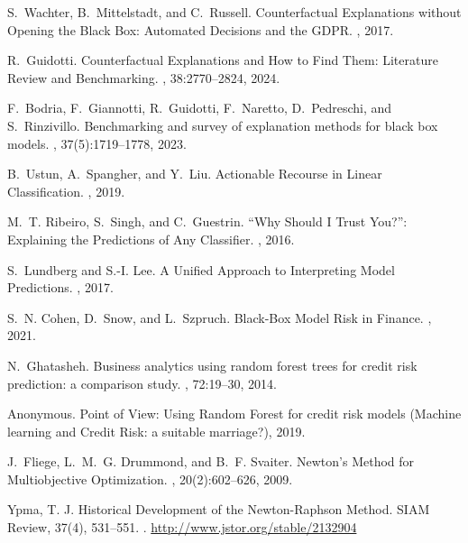 \documentclass[12pt]{extarticle}
\numberwithin{equation}{section}
\begin{document}
\begin{thebibliography}{99}

S.~Wachter, B.~Mittelstadt, and C.~Russell.
\newblock Counterfactual Explanations without Opening the Black Box: Automated Decisions and the GDPR.
, 2017.

R.~Guidotti.
\newblock Counterfactual Explanations and How to Find Them: Literature Review and Benchmarking.
, 38:2770--2824, 2024.

F.~Bodria, F.~Giannotti, R.~Guidotti, F.~Naretto, D.~Pedreschi, and S.~Rinzivillo.
\newblock Benchmarking and survey of explanation methods for black box models.
, 37(5):1719--1778, 2023.

B.~Ustun, A.~Spangher, and Y.~Liu.
\newblock Actionable Recourse in Linear Classification.
, 2019.

M.~T. Ribeiro, S.~Singh, and C.~Guestrin.
\newblock ``Why Should I Trust You?'': Explaining the Predictions of Any Classifier.
, 2016.

S.~Lundberg and S.-I. Lee.
\newblock A Unified Approach to Interpreting Model Predictions.
, 2017.

S.~N. Cohen, D.~Snow, and L.~Szpruch.
\newblock Black-Box Model Risk in Finance.
, 2021.

N.~Ghatasheh.
\newblock Business analytics using random forest trees for credit risk prediction: a comparison study.
, 72:19--30, 2014.

Anonymous.
\newblock Point of View: Using Random Forest for credit risk models (Machine learning and Credit Risk: a suitable marriage?), 2019.

J.~Fliege, L.~M.~G. Drummond, and B.~F. Svaiter.
\newblock Newton's Method for Multiobjective Optimization.
, 20(2):602--626, 2009.

Ypma, T. J. 
\newblock Historical Development of the Newton-Raphson Method. SIAM Review, 37(4), 531–551. 
.
\newblock \url{http://www.jstor.org/stable/2132904}


\end{thebibliography}
\end{document}
